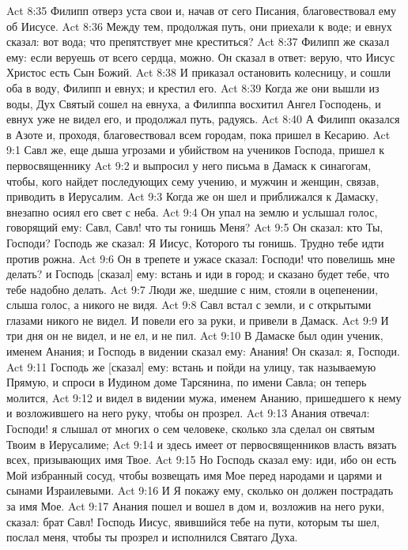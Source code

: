 Act 8:35  Филипп отверз уста свои и, начав от сего Писания, благовествовал ему об Иисусе.
Act 8:36  Между тем, продолжая путь, они приехали к воде; и евнух сказал: вот вода; что препятствует мне креститься?
Act 8:37  Филипп же сказал ему: если веруешь от всего сердца, можно. Он сказал в ответ: верую, что Иисус Христос есть Сын Божий.
Act 8:38  И приказал остановить колесницу, и сошли оба в воду, Филипп и евнух; и крестил его.
Act 8:39  Когда же они вышли из воды, Дух Святый сошел на евнуха, а Филиппа восхитил Ангел Господень, и евнух уже не видел его, и продолжал путь, радуясь.
Act 8:40  А Филипп оказался в Азоте и, проходя, благовествовал всем городам, пока пришел в Кесарию.
Act 9:1  Савл же, еще дыша угрозами и убийством на учеников Господа, пришел к первосвященнику
Act 9:2  и выпросил у него письма в Дамаск к синагогам, чтобы, кого найдет последующих сему учению, и мужчин и женщин, связав, приводить в Иерусалим.
Act 9:3  Когда же он шел и приближался к Дамаску, внезапно осиял его свет с неба.
Act 9:4  Он упал на землю и услышал голос, говорящий ему: Савл, Савл! что ты гонишь Меня?
Act 9:5  Он сказал: кто Ты, Господи? Господь же сказал: Я Иисус, Которого ты гонишь. Трудно тебе идти против рожна.
Act 9:6  Он в трепете и ужасе сказал: Господи! что повелишь мне делать? и Господь [сказал] ему: встань и иди в город; и сказано будет тебе, что тебе надобно делать.
Act 9:7  Люди же, шедшие с ним, стояли в оцепенении, слыша голос, а никого не видя.
Act 9:8  Савл встал с земли, и с открытыми глазами никого не видел. И повели его за руки, и привели в Дамаск.
Act 9:9  И три дня он не видел, и не ел, и не пил.
Act 9:10  В Дамаске был один ученик, именем Анания; и Господь в видении сказал ему: Анания! Он сказал: я, Господи.
Act 9:11  Господь же [сказал] ему: встань и пойди на улицу, так называемую Прямую, и спроси в Иудином доме Тарсянина, по имени Савла; он теперь молится,
Act 9:12  и видел в видении мужа, именем Ананию, пришедшего к нему и возложившего на него руку, чтобы он прозрел.
Act 9:13  Анания отвечал: Господи! я слышал от многих о сем человеке, сколько зла сделал он святым Твоим в Иерусалиме;
Act 9:14  и здесь имеет от первосвященников власть вязать всех, призывающих имя Твое.
Act 9:15  Но Господь сказал ему: иди, ибо он есть Мой избранный сосуд, чтобы возвещать имя Мое перед народами и царями и сынами Израилевыми.
Act 9:16  И Я покажу ему, сколько он должен пострадать за имя Мое.
Act 9:17  Анания пошел и вошел в дом и, возложив на него руки, сказал: брат Савл! Господь Иисус, явившийся тебе на пути, которым ты шел, послал меня, чтобы ты прозрел и исполнился Святаго Духа.
